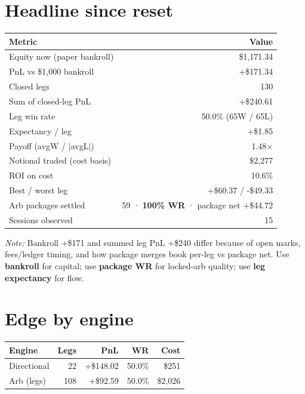 \documentclass[11pt,a4paper]{article}
\begin{document}
\section{Headline since reset}
\begin{table}[h]
\centering
\begin{tabular}{@{}lr@{}}
\toprule
\textbf{Metric} & \textbf{Value} \\
\midrule
Equity now (paper bankroll) & \$1{,}171.34 \\
PnL vs \$1{,}000 bankroll & +\$171.34 \\
Closed legs & 130 \\
Sum of closed-leg PnL & +\$240.61 \\
Leg win rate & 50.0\% (65W / 65L) \\
Expectancy / leg & +\$1.85 \\
Payoff (avgW / $|$avgL$|$) & 1.48$\times$ \\
Notional traded (cost basis) & \$2{,}277 \\
ROI on cost & 10.6\% \\
Best / worst leg & +\$60.37 / -\$49.33 \\
Arb packages settled & 59 · \textbf{100\% WR} · package net +\$44.72 \\
Sessions observed & 15 \\
\bottomrule
\end{tabular}
\end{table}

\noindent\textit{Note:} Bankroll +\$171 and summed leg PnL +\$240 differ because of open marks,
fees/ledger timing, and how package merges book per-leg vs package net. Use
\textbf{bankroll} for capital; use \textbf{package WR} for locked-arb quality;
use \textbf{leg expectancy} for flow.

\section{Edge by engine}
\begin{table}[h]
\centering
\begin{tabular}{@{}lrrrr@{}}
\toprule
\textbf{Engine} & \textbf{Legs} & \textbf{PnL} & \textbf{WR} & \textbf{Cost} \\
\midrule
Directional & 22 & +\$148.02 & 50.0\% & \$251 \\
Arb (legs) & 108 & +\$92.59 & 50.0\% & \$2{,}026 \\
\bottomrule
\end{tabular}
\end{table}
\end{document}
